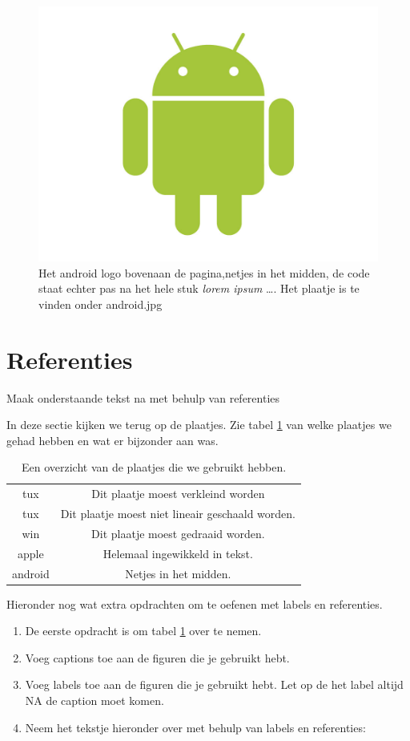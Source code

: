\documentclass{article}
\begin{document}
\begin{figure}[t!]
\centering
\includegraphics[scale = 0.35]{android}
\caption{Het android logo bovenaan de pagina,netjes in het midden, de code staat echter pas na het hele stuk \emph{lorem ipsum} \ldots. Het plaatje is te vinden onder android.jpg}
\label{fig:aeslogo}
\end{figure}
\newpage

\section{Referenties}
Maak onderstaande tekst na met behulp van referenties

In deze sectie kijken we terug op de plaatjes. Zie tabel \ref{tab:overzicht} van welke plaatjes we gehad hebben en wat er bijzonder aan was.
\begin{table}[h]
\centering
\begin{tabular}{c|c}
tux & Dit plaatje moest verkleind worden \\
tux & Dit plaatje moest niet lineair geschaald worden. \\
win & Dit plaatje moest gedraaid worden. \\
apple & Helemaal ingewikkeld in tekst. \\
android & Netjes in het midden. \\
\end{tabular}
\caption{Een overzicht van de plaatjes die we gebruikt hebben.}
\label{tab:overzicht}
\end{table}

Hieronder nog wat extra opdrachten om te oefenen met labels en referenties.
\begin{enumerate}
\item De eerste opdracht is om tabel \ref{tab:overzicht} over te nemen. 
\item Voeg captions toe aan de figuren die je gebruikt hebt.
\item Voeg labels toe aan de figuren die je gebruikt hebt. Let op de het label altijd NA de caption moet komen. 
\item Neem het tekstje hieronder over met behulp van labels en referenties:
\end{enumerate}
\end{document}
